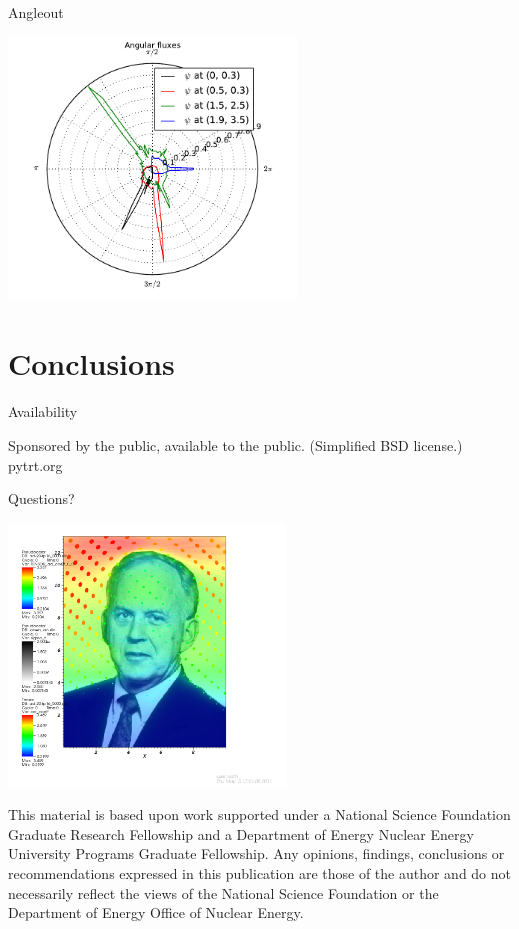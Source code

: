 \documentclass{beamer}
\begin{document}
\begin{frame}{Angleout}

{\centering\includegraphics[height=2.75in]{angleout}\par}
\end{frame}

\section{Conclusions}
\begin{frame}{Availability}

\begin{center}
Sponsored by the public, available to the public. (Simplified BSD license.)
\vspace{.5in}
  \Huge pytrt.org
\end{center}

\end{frame}

\begin{frame}{Questions?}

{\centering\includegraphics[height=2.75in]{larsen}\par}
\vspace{-\baselineskip}
{\setlength{\baselineskip}{-\baselineskip} \tiny 
This material is based upon work supported under a National Science Foundation
Graduate Research Fellowship and a Department of Energy Nuclear Energy
University Programs Graduate Fellowship. Any opinions, findings, conclusions or
recommendations expressed in this publication are those of the author and do
not necessarily reflect the views of the National Science Foundation or the
Department of Energy Office of Nuclear Energy.\par}
\end{frame}
\end{document}
